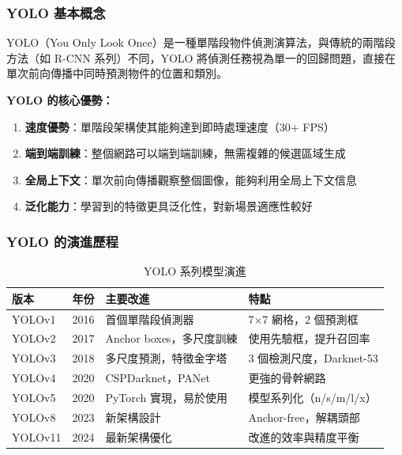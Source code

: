 \documentclass[a4paper,14pt,oneside]{article}
\begin{document}
\subsubsection{YOLO 基本概念}

YOLO（You Only Look Once）是一種單階段物件偵測演算法，與傳統的兩階段方法（如 R-CNN 系列）不同，YOLO 將偵測任務視為單一的回歸問題，直接在單次前向傳播中同時預測物件的位置和類別。

\textbf{YOLO 的核心優勢：}

\begin{enumerate}
    \item \textbf{速度優勢}：單階段架構使其能夠達到即時處理速度（30+ FPS）
    \item \textbf{端到端訓練}：整個網路可以端到端訓練，無需複雜的候選區域生成
    \item \textbf{全局上下文}：單次前向傳播觀察整個圖像，能夠利用全局上下文信息
    \item \textbf{泛化能力}：學習到的特徵更具泛化性，對新場景適應性較好
\end{enumerate}

\subsubsection{YOLO 的演進歷程}

\begin{table}[H]
    \centering
    \caption{YOLO 系列模型演進}
    \begin{tabular}{|l|l|l|p{5cm}|}
        \hline
        \textbf{版本} & \textbf{年份} & \textbf{主要改進} & \textbf{特點} \\
        \hline
        YOLOv1 & 2016 & 首個單階段偵測器 & 7×7 網格，2 個預測框 \\
        \hline
        YOLOv2 & 2017 & Anchor boxes，多尺度訓練 & 使用先驗框，提升召回率 \\
        \hline
        YOLOv3 & 2018 & 多尺度預測，特徵金字塔 & 3 個檢測尺度，Darknet-53 \\
        \hline
        YOLOv4 & 2020 & CSPDarknet，PANet & 更強的骨幹網路 \\
        \hline
        YOLOv5 & 2020 & PyTorch 實現，易於使用 & 模型系列化（n/s/m/l/x） \\
        \hline
        YOLOv8 & 2023 & 新架構設計 & Anchor-free，解耦頭部 \\
        \hline
        YOLOv11 & 2024 & 最新架構優化 & 改進的效率與精度平衡 \\
        \hline
    \end{tabular}
\end{table}
\end{document}
